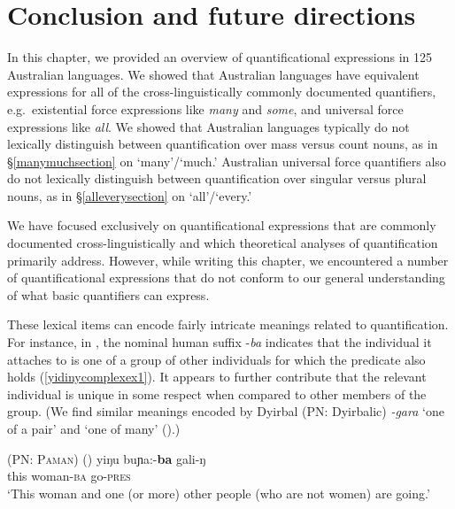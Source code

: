\documentclass[12pt,egregdoesnotlikesansseriftitles]{scrartcl}
\begin{document}
\section{Conclusion and future directions}

In this chapter, we provided an overview of quantificational expressions in 125 Australian languages. We showed that Australian languages have equivalent expressions for all of the cross-linguistically commonly documented quantifiers, e.g.\ existential force expressions like \textit{many} and \textit{some}, and universal force expressions like \textit{all}. We showed that Australian languages typically do not lexically distinguish between quantification over mass versus count nouns, as in \S\ref{manymuchsection} on `many'/`much.' Australian universal force quantifiers also do not lexically distinguish between quantification over singular versus plural nouns, as in \S\ref{alleverysection} on `all'/`every.'

We have focused exclusively on quantificational expressions that are commonly documented cross-linguistically and which theoretical analyses of quantification primarily address. However, while writing this chapter, we encountered a number of quantificational expressions that do not conform to our general understanding of what basic quantifiers can express. 

These lexical items can encode fairly intricate meanings related to quantification. For instance, in  {}, the nominal human suffix -\textit{ba} indicates that the individual it attaches to is one of a group of other individuals for which the predicate also holds (\ref{yidinycomplexex1}). It appears to further contribute that the relevant individual is unique in some respect when compared to other members of the group. (We find similar meanings encoded by Dyirbal (PN: Dyirbalic)  \textit{-gara} `one of a pair' and {} `one of many' (\citealt[230--231]{dixon72}).)


\begin{exe}
\ex \textsc{ (PN: Paman)} \hfill (\citealt[146]{dixon77}) \label{yidinycomplexex1}
\vspace{-2mm}
\gll yiŋu buɲa:-\textbf{ba}          gali-ŋ \\
  this woman-\textsc{ba}   go-\textsc{pres} \\
  \vspace{-2mm}
`This woman and one (or more) other people (who are not women) are     going.'
\end{exe}
\end{document}
